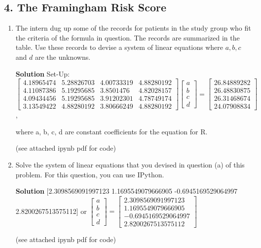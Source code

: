 \documentclass{article}\usepackage{amsmath,amssymb,amsthm,tikz,tkz-graph,color,chngpage,soul,hyperref,csquotes,graphicx,floatrow}\newcommand*{\QEDB}{\hfill\ensuremath{\square}}\newtheorem*{prop}{Proposition}\renewcommand{\theenumi}{\alph{enumi}}\usepackage[shortlabels]{enumitem}\usepackage[nobreak=true]{mdframed}\usetikzlibrary{matrix,calc}\MakeOuterQuote{"}\usepackage[margin=1in]{geometry} \newtheorem{theorem}{Theorem}
\begin{document}
\subsection*{4. The Framingham Risk Score}
\begin{enumerate}
\item The intern dug up some of the records for patients in the study group who fit the criteria of the formula in question. The records are summarized in the table. Use these records to devise a system of linear equations where $a,b,c$ and $d$ are the unknowns.
\begin{mdframed}
\textbf{Solution} Set-Up:$\begin{bmatrix} 4.18965474 & 5.28826703 & 4.00733319 & 4.88280192 \\ 4.11087386 & 5.19295685 & 3.8501476 & 4.82028157 \\ 4.09434456 & 5.19295685 & 3.91202301 & 4.78749174 \\ 3.13549422 & 4.88280192 & 3.80666249 & 4.88280192 \end{bmatrix} \begin{bmatrix} a\\ b\\c\\d \end{bmatrix} = \begin{bmatrix} 26.84889282 \\ 26.48830875 \\ 26.31468674 \\ 24.07908834 \end{bmatrix}$,

where a, b, c, d are constant coefficients for the equation for R.

(see attached ipynb pdf for code)%
\end{mdframed}
\item Solve the system of linear equations that you devised in question (a) of this problem. For this question, you can use IPython.
\begin{mdframed}
\textbf{Solution} [2.3098569091997123 1.1695549079666905 -0.6945169529064997 2.8200267513575112] or $\begin{bmatrix} a\\b\\c\\d \end{bmatrix} = \begin{bmatrix} 2.3098569091997123\\1.1695549079666905\\-0.6945169529064997\\2.8200267513575112\end{bmatrix}$

(see attached ipynb pdf for code)%
\end{mdframed}
\end{enumerate}
\clearpage
\end{document}
